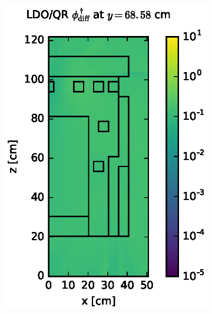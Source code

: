\begin{figure}[!htb]
\centering
\begin{subfigure}{0.4\textwidth}
\includegraphics[max height=0.445\textheight]
{img/dlvn-plots/fwc-adj/flux-diff-rel-qr04.eps}
\label{dlvn-fwc-qr-ldo}
\end{subfigure} ~
\begin{subfigure}{0.4\textwidth}

\end{subfigure}
\end{figure}
